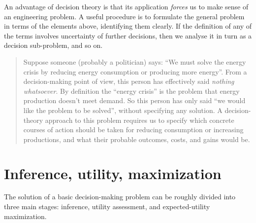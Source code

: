 \documentclass[
  a4paper,
  DIV=11,
  numbers=noendperiod,
  oneside]{scrreprt}
\begin{document}
An advantage of decision theory is that its application \emph{forces} us
to make sense of an engineering problem. A useful procedure is to
formulate the general problem in terms of the elements above,
identifying them clearly. If the definition of any of the terms involves
uncertainty of further decisions, then we analyse it in turn as a
decision sub-problem, and so on.

\begin{quote}
Suppose someone (probably a politician) says: ``We must solve the energy
crisis by reducing energy consumption or producing more energy''. From a
decision-making point of view, this person has effectively said
\emph{nothing whatsoever}. By definition the ``energy crisis'' is the
problem that energy production doesn't meet demand. So this person has
only said ``we would like the problem to be solved'', without specifying
any solution. A decision-theory approach to this problem requires us to
specify which concrete courses of action should be taken for reducing
consumption or increasing productions, and what their probable outcomes,
costs, and gains would be.
\end{quote}


\hypertarget{inference-utility-maximization}{%
\section{Inference, utility,
maximization}\label{inference-utility-maximization}}

The solution of a basic decision-making problem can be roughly divided
into three main stages: inference, utility assessment, and
expected-utility maximization.
\end{document}
